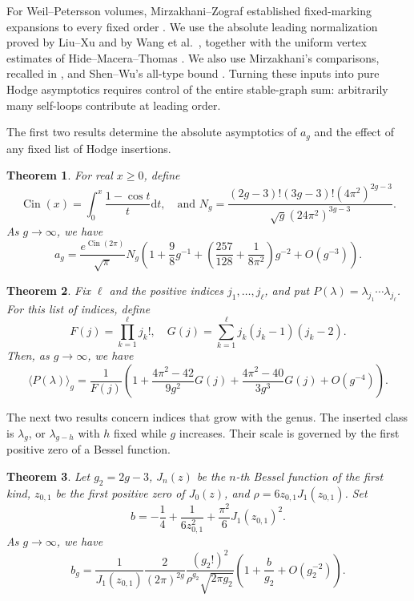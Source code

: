 \documentclass[a4paper,10pt]{article}
\numberwithin{equation}{section}
\newcommand{\dd}{\mathrm{d}}
\DeclareMathOperator{\Cin}{\mathrm{Cin}}
\theoremstyle{paperplain}
\newtheorem{thm}{Theorem}[section]
\theoremstyle{paperremark}
\theoremstyle{paperplain}
\begin{document}
For Weil--Petersson volumes, Mirzakhani--Zograf established
fixed-marking expansions to every fixed order
\cite[Theorem 1.2]{MZ15}. We use the absolute leading normalization
proved by Liu--Xu \cite[Corollary 1.2]{LX26} and by Wang et al.\
\cite[Corollary 1.2]{W26}, together with the uniform vertex
estimates of Hide--Macera--Thomas \cite[Theorem 4.2]{HMT25}.
We also use Mirzakhani's comparisons, recalled in \cite[Lemma 14]{SW25},
and Shen--Wu's all-type bound \cite[Lemma 18]{SW25}.
Turning these inputs into pure Hodge asymptotics requires control
of the entire stable-graph sum: arbitrarily many self-loops
contribute at leading order.

The first two results determine the absolute asymptotics of $a_g$
and the effect of any fixed list of Hodge insertions.

\begin{thm}
\label{thm:lambda-one}
For real $x\geq0$, define
\[\Cin(x)=\int_0^x \frac{1-\cos t}{t}\dd t, \quad
\mbox{and } N_g=\frac{(2g-3)!(3g-3)!(4\pi^2)^{2g-3}}{\sqrt{g}(24\pi^2)^{3g-3}}.\]
As $g\to \infty$, we have
\begin{equation}
a_g=\frac{e^{\Cin(2\pi)}}{\sqrt{\pi}}N_g
\left(1+\frac{9}{8}g^{-1}+\left(\frac{257}{128}+\frac{1}{8\pi^2}\right)g^{-2}+O(g^{-3})\right).
\label{eq:111}
\end{equation}
\end{thm}

\begin{thm}
\label{thm:fixed-insertions}
Fix $\ell$ and the positive indices $j_1,\ldots,j_\ell$, and put
$P(\lambda)=\lambda_{j_1}\cdots\lambda_{j_\ell}$.  For this list of
indices, define
\[F(j)=\prod_{k=1}^\ell j_k!, \quad G(j)=\sum_{k=1}^\ell j_k(j_k-1)(j_k-2).\]
Then, as $g\to\infty$, we have
\begin{equation}
\langle P(\lambda) \rangle_g=\frac{1}{F(j)}\left(1+\frac{4\pi^2-42}{9g^2}G(j)+
\frac{4\pi^2-40}{3g^3}G(j)+O(g^{-4})\right).
\label{eq:P111}
\end{equation}
\end{thm}

The next two results concern indices that grow with the genus.
The inserted class is $\lambda_g$, or $\lambda_{g-h}$ with $h$
fixed while $g$ increases. Their scale is governed by the first
positive zero of a Bessel function.

\begin{thm}
\label{thm:top-hodge}
Let $g_2=2g-3$, $J_n(z)$ be the $n$-th Bessel function of the first kind, $z_{0,1}$ be the first
positive zero of $J_0(z)$, and $\rho=6z_{0,1}J_1(z_{0,1})$.
Set
\[b=-\frac{1}{4}+\frac{1}{6z_{0,1}^2}+\frac{\pi^2}{6}J_1(z_{0,1})^2.\]
As $g\to\infty$, we have
\begin{equation}
b_g=\frac{1}{J_1(z_{0,1})}\frac{2}{(2\pi)^{2g}}\frac{(g_2!)^2}{\rho^{g_2}\sqrt{2\pi g_2}}\left(
1+\frac{b}{g_2}+O(g_2^{-2})\right).
\label{eq:g111}
\end{equation}
\end{thm}
\end{document}
